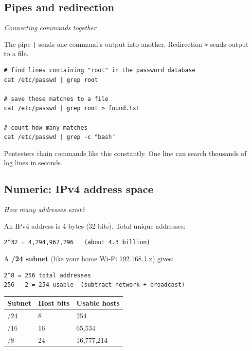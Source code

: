 \documentclass[12pt,openany]{book}
\begin{document}
\medskip

\subsection*{Pipes and redirection}
{\small\itshape\color{gray}Connecting commands together}

The pipe \texttt{|} sends one command's output into another. Redirection \texttt{\textgreater{}} sends output to a file.


\begin{lstlisting}
# find lines containing "root" in the password database
cat /etc/passwd | grep root

# save those matches to a file
cat /etc/passwd | grep root > found.txt

# count how many matches
cat /etc/passwd | grep -c "bash"\end{lstlisting}


Pentesters chain commands like this constantly. One line can search thousands of log lines in seconds.

\medskip

\subsection*{Numeric: IPv4 address space}
{\small\itshape\color{gray}How many addresses exist?}

An IPv4 address is 4 bytes (32 bits). Total unique addresses:


\begin{lstlisting}
2^32 = 4,294,967,296   (about 4.3 billion)\end{lstlisting}


A \textbf{/24 subnet} (like your home Wi-Fi 192.168.1.x) gives:


\begin{lstlisting}
2^8 = 256 total addresses
256 - 2 = 254 usable  (subtract network + broadcast)
\end{lstlisting}


\begin{center}\small\begin{tabular}{p{4.3cm}p{4.3cm}p{4.3cm}}\toprule
\textbf{Subnet} & \textbf{Host bits} & \textbf{Usable hosts} \\ \midrule
/24 & 8 & 254 \\
/16 & 16 & 65,534 \\
/8 & 24 & 16,777,214 \\
\bottomrule\end{tabular}\end{center}
\end{document}
